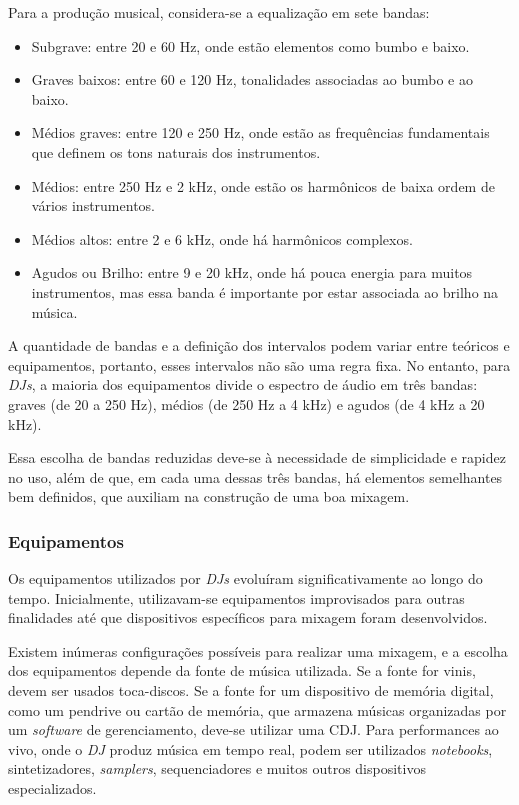 Para a produção musical, considera-se a equalização em sete bandas:

\begin{itemize}
	\item Subgrave: entre 20 e 60 Hz, onde estão elementos como bumbo e baixo.
	\item Graves baixos: entre 60 e 120 Hz, tonalidades associadas ao bumbo e ao baixo.
	\item Médios graves: entre 120 e 250 Hz, onde estão as frequências fundamentais que definem os tons naturais dos instrumentos.
	\item Médios: entre 250 Hz e 2 kHz, onde estão os harmônicos de baixa ordem de vários instrumentos.
	\item Médios altos: entre 2 e 6 kHz, onde há harmônicos complexos.
	\item Agudos ou Brilho: entre 9 e 20 kHz, onde há pouca energia para muitos instrumentos, mas essa banda é importante por estar associada ao brilho na música.
\end{itemize}

A quantidade de bandas e a definição dos intervalos podem variar entre teóricos e equipamentos, portanto, esses intervalos não são uma regra fixa. No entanto, para \textit{DJs}, a maioria dos equipamentos divide o espectro de áudio em três bandas: graves (de 20 a 250 Hz), médios (de 250 Hz a 4 kHz) e agudos (de 4 kHz a 20 kHz).

Essa escolha de bandas reduzidas deve-se à necessidade de simplicidade e rapidez no uso, além de que, em cada uma dessas três bandas, há elementos semelhantes bem definidos, que auxiliam na construção de uma boa mixagem.



\subsubsection{Equipamentos}

Os equipamentos utilizados por \textit{DJs} evoluíram significativamente ao longo do tempo. Inicialmente, utilizavam-se equipamentos improvisados para outras finalidades até que dispositivos específicos para mixagem foram desenvolvidos.

Existem inúmeras configurações possíveis para realizar uma mixagem, e a escolha dos equipamentos depende da fonte de música utilizada. Se a fonte for vinis, devem ser usados toca-discos. Se a fonte for um dispositivo de memória digital, como um pendrive ou cartão de memória, que armazena músicas organizadas por um \textit{software} de gerenciamento, deve-se utilizar uma CDJ. Para performances ao vivo, onde o \textit{DJ} produz música em tempo real, podem ser utilizados \textit{notebooks}, sintetizadores, \textit{samplers}, sequenciadores e muitos outros dispositivos especializados.


